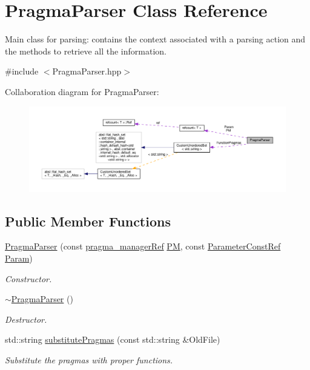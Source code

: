 \hypertarget{classPragmaParser}{}\section{Pragma\+Parser Class Reference}
\label{classPragmaParser}


Main class for parsing\+: contains the context associated with a parsing action and the methods to retrieve all the information.  




{\ttfamily \#include $<$Pragma\+Parser.\+hpp$>$}



Collaboration diagram for Pragma\+Parser\+:
\nopagebreak
\begin{figure}[H]
\begin{center}
\leavevmode
\includegraphics[width=350pt]{d7/df3/classPragmaParser__coll__graph}
\end{center}
\end{figure}
\subsection*{Public Member Functions}
\begin{DoxyCompactItemize}
\item 
\hyperlink{classPragmaParser_a34a232bfaef4e229d656ab163a9e4666}{Pragma\+Parser} (const \hyperlink{pragma__manager_8hpp_a6eb2deb9c5e77014dd1702c2971b1921}{pragma\+\_\+manager\+Ref} \hyperlink{classPragmaParser_a6972c78ee4e9f7bef88a70df69118660}{PM}, const \hyperlink{Parameter_8hpp_a37841774a6fcb479b597fdf8955eb4ea}{Parameter\+Const\+Ref} \hyperlink{classPragmaParser_a29c814a59a2860e1cd13ec5c5847ad0e}{Param})
\begin{DoxyCompactList}\small\item\em Constructor. \end{DoxyCompactList}\item 
\hyperlink{classPragmaParser_ae039c214e80153245ca2a03f824f7abf}{$\sim$\+Pragma\+Parser} ()
\begin{DoxyCompactList}\small\item\em Destructor. \end{DoxyCompactList}\item 
std\+::string \hyperlink{classPragmaParser_a349706150aebec2e28658e6a880da5e0}{substitute\+Pragmas} (const std\+::string \&Old\+File)
\begin{DoxyCompactList}\small\item\em Substitute the pragmas with proper functions. \end{DoxyCompactList}\end{DoxyCompactItemize}
